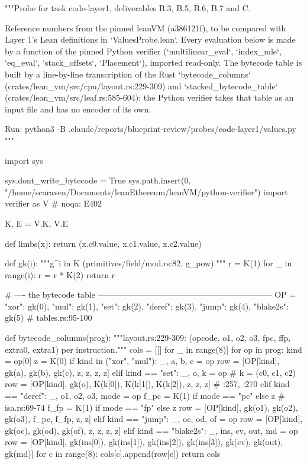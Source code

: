 \begin{srccode}
"""Probe for task code-layer1, deliverables B.3, B.5, B.6, B.7 and C.

Reference numbers from the pinned leanVM (a386121f), to be compared with Layer 1's Lean
definitions in `ValuesProbe.lean`. Every evaluation below is made by a function of the pinned
Python verifier (`multilinear_eval`, `index_mle`, `eq_eval`, `stack_offsets`, `Placement`),
imported read-only. The bytecode table is built by a line-by-line transcription of the Rust
`bytecode_columns` (crates/lean_vm/src/cpu/layout.rs:229-309) and `stacked_bytecode_table`
(crates/lean_vm/src/leaf.rs:585-604): the Python verifier takes that table as an input file and
has no encoder of its own.

Run:  python3 -B .claude/reports/blueprint-review/probes/code-layer1/values.py
"""

import sys

sys.dont_write_bytecode = True
sys.path.insert(0, "/home/scaraven/Documents/leanEthereum/leanVM/python-verifier")
import verifier as V  # noqa: E402

K, E = V.K, V.E


def limbs(x):
    return (x.c0.value, x.c1.value, x.c2.value)


def gk(i):
    """g^i in K (primitives/field/mod.rs:82, g_pow)."""
    r = K(1)
    for _ in range(i):
        r = r * K(2)
    return r


# ---- the bytecode table ---------------------------------------------------------------
OP = {"xor": gk(0), "mul": gk(1), "set": gk(2), "deref": gk(3), "jump": gk(4), "blake2s": gk(5)}  # tables.rs:95-100


def bytecode_columns(prog):
    """layout.rs:229-309: (opcode, o1, o2, o3, fpc, ffp, extra0, extra1) per instruction."""
    cols = [[] for _ in range(8)]
    for op in prog:
        kind = op[0]
        z = K(0)
        if kind in ("xor", "mul"):
            _, a, b, c = op
            row = [OP[kind], gk(a), gk(b), gk(c), z, z, z, z]
        elif kind == "set":
            _, o, k = op  # k = (c0, c1, c2)
            row = [OP[kind], gk(o), K(k[0]), K(k[1]), K(k[2]), z, z, z]  # :257, :270
        elif kind == "deref":
            _, o1, o2, o3, mode = op
            f_pc = K(1) if mode == "pc" else z  # isa.rs:69-74
            f_fp = K(1) if mode == "fp" else z
            row = [OP[kind], gk(o1), gk(o2), gk(o3), f_pc, f_fp, z, z]
        elif kind == "jump":
            _, oc, od, of = op
            row = [OP[kind], gk(oc), gk(od), gk(of), z, z, z, z]
        elif kind == "blake2s":
            _, ins, cv, out, md = op
            row = [OP[kind], gk(ins[0]), gk(ins[1]), gk(ins[2]), gk(ins[3]), gk(cv), gk(out), gk(md)]
        for c in range(8):
            cols[c].append(row[c])
    return cols



\end{srccode}
